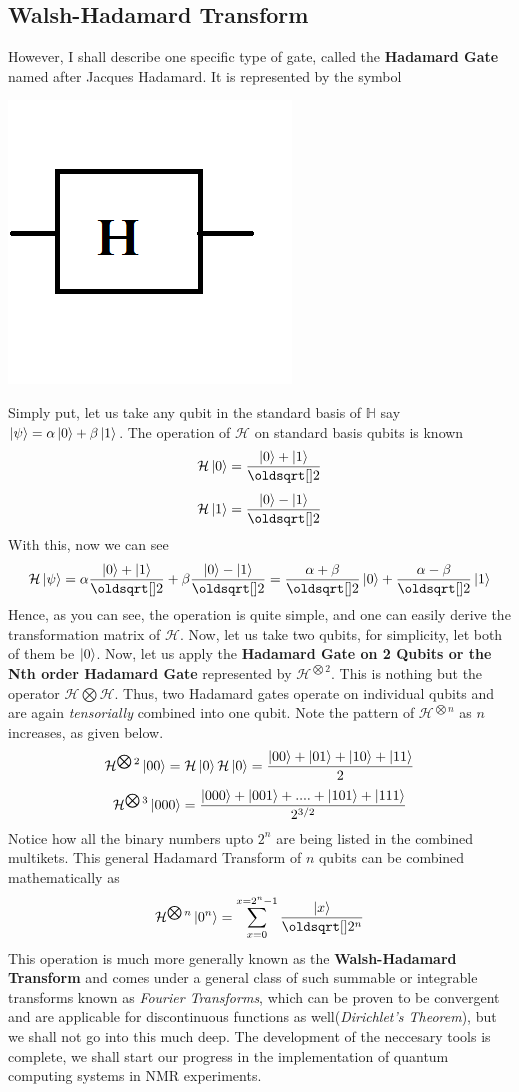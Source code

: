 \documentclass[12pt]{article}
\begin{document}
\subsection{Walsh-Hadamard Transform}
However, I shall describe one specific type of gate, called the \textbf{Hadamard Gate} named after Jacques Hadamard. It is represented by the symbol 
\begin{center}
\includegraphics[scale=0.5]{qhad.png}
\end{center}
Simply put, let us take any qubit in the standard basis of $\mathbb{H}$ say $\Ket{\psi} = \alpha\Ket{0} + \beta\Ket{1}$. The operation of $\mathcal{H}$ on standard basis qubits is known $$\mathcal{H}\Ket{0} = \frac{\Ket{0}+\Ket{1}}{\sqrt{2}}$$
$$\mathcal{H}\Ket{1} = \frac{\Ket{0}-\Ket{1}}{\sqrt{2}}$$
With this, now we can see
$$\mathcal{H}\Ket{\psi} = \alpha\frac{\Ket{0}+\Ket{1}}{\sqrt{2}} + \beta\frac{\Ket{0}-\Ket{1}}{\sqrt{2}} = \frac{\alpha + \beta}{\sqrt{2}}\Ket{0} + \frac{\alpha - \beta}{\sqrt{2}}\Ket{1}$$
Hence, as you can see, the operation is quite simple, and one can easily derive the transformation matrix of $\mathcal{H}$. Now, let us take two qubits, for simplicity, let both of them be $\Ket{0}$. Now, let us apply the \textbf{Hadamard Gate on 2 Qubits or the Nth order Hadamard Gate} represented by $\mathcal{H}^{\bigotimes 2}$. This is nothing but the operator $\mathcal{H}\bigotimes\mathcal{H}$. Thus, two Hadamard gates operate on individual qubits and are again \textit{tensorially} combined into one qubit. Note the pattern of $\mathcal{H}^{\bigotimes n}$ as $n$ increases, as given below.
$$\mathcal{H}^{\bigotimes 2}\Ket{00} = \mathcal{H}\Ket{0}\mathcal{H}\Ket{0} = \frac{\Ket{00}+\Ket{01}+\Ket{10}+\Ket{11}}{2}$$
$$\mathcal{H}^{\bigotimes 3}\Ket{000} = \frac{\Ket{000}+\Ket{001}+....+\Ket{101}+\Ket{111}}{2^{3/2}}$$ Notice how all the binary numbers upto $2^n$ are being listed in the combined multikets. This general Hadamard Transform of $n$ qubits can be combined mathematically as
$$\mathcal{H}^{\bigotimes n}\Ket{0^n} = \sum_{x=0}^{x=2^n-1}\frac{\Ket{x}}{\sqrt{2^n}}$$ This operation is much more generally known as the \textbf{Walsh-Hadamard Transform} and comes under a general class of such summable or integrable transforms known as \textit{Fourier Transforms}, which can be proven to be convergent and are applicable for discontinuous functions as well(\textit{Dirichlet's Theorem}), but we shall not go into this much deep. The development of the neccesary tools is complete, we shall start our progress in the implementation of quantum computing systems in NMR experiments.
\clearpage
\end{document}
